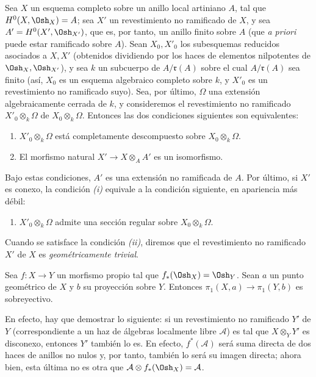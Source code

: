  Sea $X$ un esquema completo sobre un anillo local artiniano
$A$, tal que $H^0(X,\Osh_X)=A$; sea $X'$ un revestimiento no ramificado de $X$,
y sea $A'=H^0(X',\Osh_{X'})$, que es, por tanto, un anillo finito sobre $A$
(que \textit{a priori} puede estar ramificado sobre $A$). Sean $X_0,X'_0$ los
subesquemas reducidos asociados a $X,X'$ (obtenidos dividiendo por los haces de
elementos nilpotentes de $\Osh_X,\Osh_{X'}$), y sea $k$ un subcuerpo de
$A/\mathfrak r(A)$ sobre el cual $A/\mathfrak r(A)$ sea finito (así, $X_0$ es
un esquema algebraico completo sobre $k$, y $X'_0$ es un revestimiento no
ramificado suyo). Sea, por último, $\Omega$ una extensión algebraicamente
cerrada de $k$, y consideremos el revestimiento no ramificado
$X'_0\otimes_k\Omega$ de $X_0\otimes_k\Omega$. Entonces las dos condiciones
siguientes son equivalentes:
\begin{enumerate}
  \item[\textit{i.}] $X'_0\otimes_k\Omega$ está completamente descompuesto
    sobre $X_0\otimes_k\Omega$.
  \item[\textit{ii.}] El morfismo natural
    $X'\longrightarrow X\otimes_A A'$ es un isomorfismo.
\end{enumerate}
Bajo estas condiciones, $A'$ es una extensión no ramificada de $A$. Por último,
si $X'$ es conexo, la condición \textit{(i)} equivale a la condición siguiente,
en apariencia más débil:
\begin{enumerate}
  \item[\textit{i bis.}] $X'_0\otimes_k\Omega$ admite una sección regular
    sobre $X_0\otimes_k\Omega$.
\end{enumerate}
Cuando se satisface la condición \textit{(ii)}, diremos que el revestimiento no
ramificado $X'$ de $X$ es \emph{geométricamente trivial}.

 Sea $f:X\longrightarrow Y$ un morfismo propio tal que
$f_*(\Osh_X)=\Osh_Y$. Sean $a$ un punto geométrico de $X$ y $b$ su proyección
sobre $Y$. Entonces $\pi_1(X,a)\longrightarrow\pi_1(Y,b)$ es sobreyectivo.

En efecto, hay que demostrar lo siguiente: si un revestimiento no ramificado
$Y'$ de $Y$ (correspondiente a un haz de álgebras localmente libre
$\mathcal A$) es tal que $X\otimes_Y Y'$ es disconexo, entonces $Y'$ también lo
es. En efecto, $f^*(\mathcal A)$ será suma directa de dos haces de anillos no
nulos y, por tanto, también lo será su imagen directa; ahora bien, esta última
no es otra que $\mathcal A\otimes f_*(\Osh_X)=\mathcal A$.

